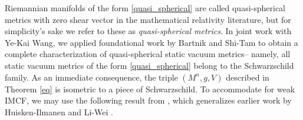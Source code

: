 \documentclass[12pt]{amsart}
\theoremstyle{definition}
\numberwithin{equation}{section}
\begin{document}



Riemannian manifolds of the form \eqref{quasi_spherical} are called quasi-spherical metrics with zero shear vector in the mathematical relativity literature, but for simplicity's sake we refer to these as \textit{quasi-spherical metrics}. In joint work \cite{HW24a} with Ye-Kai Wang, we applied foundational work by Bartnik \cite{B93} and Shi-Tam \cite{ST02} to obtain a complete characterization of quasi-spherical static vacuum metrics-- namely, all static vacuum metrics of the form \eqref{quasi_spherical} belong to the Schwarzschild family. As an immediate consequence, the triple $(M^{n},g,V)$ described in Theorem \ref{eq} is isometric to a piece of Schwarzschild. To accommodate for weak IMCF, we may use the following result from \cite{HW24a}, which generalizes earlier work by Huisken-Ilmanen \cite{HI08} and Li-Wei \cite{LW17}.
\end{document}
